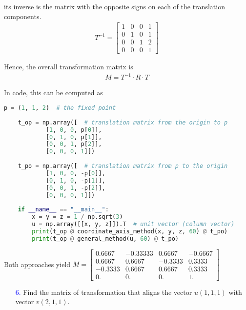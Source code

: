 \documentclass[11pt]{article}  %
\begin{document}
    its inverse is the matrix with the opposite signs on each of the translation components.
    \begin{align*}
        T^{-1}=\begin{bmatrix}
            1 & 0 & 0 & 1\\
            0 & 1 & 0 & 1\\
            0 & 0 & 1 & 2\\
            0 & 0 & 0 & 1
        \end{bmatrix}
    \end{align*}
    
    Hence, the overall transformation matrix is
    \begin{align*}
        M=T^{-1} \cdot R \cdot T
    \end{align*}
    
    In code, this can be computed as\\
    \begin{lstlisting}[language=python,numbers=none]
    p = (1, 1, 2)  # the fixed point
    
    t_op = np.array([  # translation matrix from the origin to p
            [1, 0, 0, p[0]],
            [0, 1, 0, p[1]],
            [0, 0, 1, p[2]],
            [0, 0, 0, 1]])
    
    t_po = np.array([  # translation matrix from p to the origin
            [1, 0, 0, -p[0]],
            [0, 1, 0, -p[1]],
            [0, 0, 1, -p[2]],
            [0, 0, 0, 1]])
    
    if __name__ == "__main__":
        x = y = z = 1 / np.sqrt(3)
        u = np.array([[x, y, z]]).T  # unit vector (column vector)
        print(t_op @ coordinate_axis_method(x, y, z, 60) @ t_po)
        print(t_op @ general_method(u, 60) @ t_po)
    \end{lstlisting}
    
    Both approaches yield
    $M = \begin{bmatrix}
    0.6667 & -0.33333 &  0.6667 & -0.6667\\
    0.6667 &  0.6667 & -0.3333 &  0.3333\\
    -0.3333 &  0.6667 &  0.6667 &  0.3333\\
    0.      &  0.     &  0.     &  1.
    \end{bmatrix}$\\

    \begin{enumerate}[leftmargin=*]
        \item[\textcolor{blue}{6.}] Find the matrix of transformation that aligns the vector $u(1,1,1)$ with vector $v(2,1,1)$.
    \end{enumerate}
    
\end{document}
